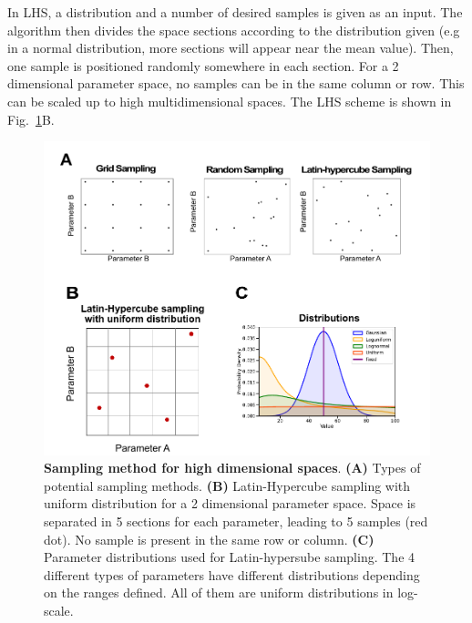 In LHS, a distribution and a number of desired samples is given as an input.
The algorithm then divides the space sections according to the distribution given (e.g in a normal distribution, more sections will appear near the mean value).
Then, one sample is positioned randomly somewhere in each section.
For a 2 dimensional parameter space, no samples can be in the same column or row.
This can be scaled up to high multidimensional spaces. %
The LHS scheme is shown in Fig.~\ref{distributions}B.
\begin{figure}[H]

    \includegraphics[width=1\textwidth]{chapters/Methods/distributions}
    \caption{\textbf{Sampling method for high dimensional spaces}. \textbf{(A)} Types of potential sampling methods. \textbf{(B)} Latin-Hypercube sampling with uniform distribution for a 2 dimensional parameter space. Space is separated in 5 sections for each parameter, leading to 5 samples (red dot). No sample is present in the same row or column. \textbf{(C)} Parameter distributions used for Latin-hypersube sampling. The 4 different types of parameters have different distributions depending on the ranges defined. All of them are uniform distributions in log-scale. }
    \label{distributions}
\end{figure}
